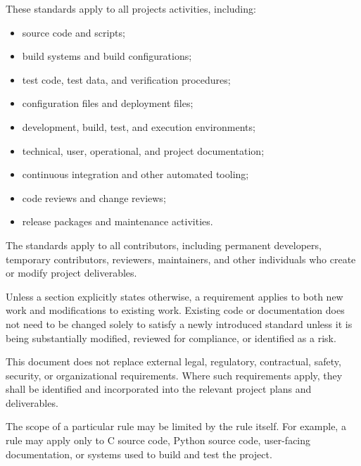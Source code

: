 These standards apply to all projects activities, including:
\begin{itemize}
    \item source code and scripts;
    \item build systems and build configurations;
    \item test code, test data, and verification procedures;
    \item configuration files and deployment files;
    \item development, build, test, and execution environments;
    \item technical, user, operational, and project documentation;
    \item continuous integration and other automated tooling;
    \item code reviews and change reviews;
    \item release packages and maintenance activities.
\end{itemize}

The standards apply to all contributors, including permanent developers, temporary contributors, reviewers, maintainers, and other individuals who create or modify project deliverables.

Unless a section explicitly states otherwise, a requirement applies to both new work and modifications to existing work. Existing code or documentation does not need to be changed solely to satisfy a newly introduced standard unless it is being substantially modified, reviewed for compliance, or identified as a risk.

This document does not replace external legal, regulatory, contractual, safety, security, or organizational requirements. Where such requirements
apply, they shall be identified and incorporated into the relevant project plans and deliverables.

The scope of a particular rule may be limited by the rule itself. For example, a rule may apply only to C source code, Python source code, user-facing documentation, or systems used to build and test the project.
